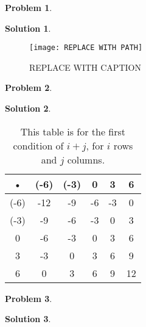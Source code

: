 \documentclass[10pt]{article}
\theoremstyle{plain}
\theoremstyle{definition}
\newtheorem*{prob}{Problem}
\newtheorem*{sol}{Solution}
\theoremstyle{remark}
\begin{document}
\pagebreak

\begin{prob}

\end{prob}

\medskip

\begin{sol}

\end{sol}

\medskip

\begin{figure}[h]
\begin{center}
\texttt{[image:  REPLACE WITH PATH]} 
\end{center}
\caption{ REPLACE WITH CAPTION }
\end{figure}


\pagebreak

\begin{prob}

\end{prob}

\medskip

\begin{sol}

\end{sol}

\medskip

\begin{table}
\begin{center}
\begin{tabular}{|c|c|c|c|c|c|}
\hline 
• & (-6) & (-3) & 0 & 3 & 6 \\ 
\hline 
(-6) & -12 & -9 & -6 & -3 & 0 \\ 
\hline 
(-3) & -9 & -6 & -3 & 0 & 3 \\ 
\hline 
0 & -6 & -3 & 0 & 3 & 6 \\ 
\hline 
3 & -3 & 0 & 3 & 6 & 9 \\ 
\hline 
6 & 0 & 3 & 6 & 9 & 12 \\ 
\hline 
\end{tabular} 
\caption{This table is for the first condition of $i + j$, for $i$ rows and $j$ columns.}
\end{center}
\end{table}

\pagebreak

\begin{prob}

\end{prob}

\medskip

\begin{sol}

\end{sol}

\medskip

\begin{tikzpicture}

\end{tikzpicture}
\end{document}

